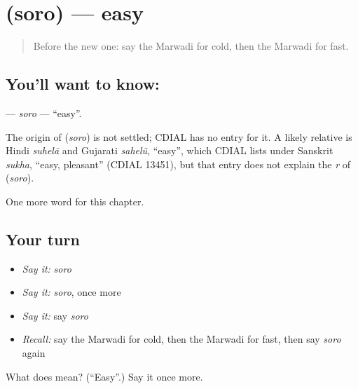 \section[\texorpdfstring{\mw{सोरो} (soro)}{सोरो (soro)}]{ (soro) — easy}

\label{lesson:MW-C74-soro}



\begin{quote}
Before the new one: say the Marwadi for cold, then the Marwadi for fast.
\end{quote}

\subsection*{You'll want to know: }
\textbf{} — \emph{soro} — \textquotedblleft{}easy\textquotedblright{}.

\begin{cousinweb}
The origin of \textbf{} (\emph{soro}) is not settled; CDIAL has no entry for it. A likely relative is Hindi \emph{suhelā} and Gujarati \emph{sahelũ}, \textquotedblleft{}easy\textquotedblright{}, which CDIAL lists under Sanskrit \emph{sukha}, \textquotedblleft{}easy, pleasant\textquotedblright{} (CDIAL 13451), but that entry does not explain the \emph{r} of \textbf{} (\emph{soro}).
\end{cousinweb}

\begin{grammarlens}[title={What you've built}]
One more word for this chapter.
\end{grammarlens}

\subsection*{Your turn}
\begin{itemize}
\raggedright
  \item \emph{Say it:} \emph{soro}
  \item \emph{Say it:} \emph{soro}, once more
  \item \emph{Say it:} say \emph{soro}
  \item \emph{Recall:} say the Marwadi for cold, then the Marwadi for fast, then say \emph{soro} again
\end{itemize}

\begin{tcolorbox}[breakable,colback=teal!4,colframe=teal!35!black,title={Before you move on}]
What does  mean? (\textquotedblleft{}Easy\textquotedblright{}.) Say it once more.
\end{tcolorbox}
